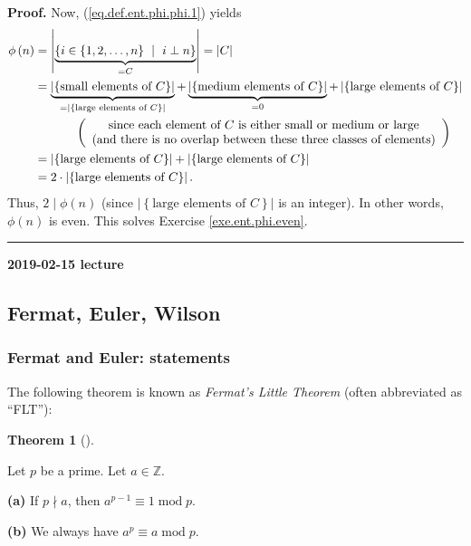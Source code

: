 \documentclass[numbers=enddot,12pt,final,onecolumn,notitlepage]{scrartcl}%
\numberwithin{exer}{subsection}
\theoremstyle{definition}
\newtheorem{theo}{Theorem}[subsection]
\newenvironment{theorem}[1][]
{\begin{theo}[#1]\begin{leftbar}}
{\end{leftbar}\end{theo}}
\newenvironment{fineprint}{\begin{small}}{\end{small}}
\newenvironment{proof}[1][Proof]{\noindent\textbf{#1.} }{\ \rule{0.5em}{0.5em}}
\begin{document}
\begin{fineprint}
\begin{proof}
Now, (\ref{eq.def.ent.phi.phi.1}) yields%
\begin{align*}
\phi\left(  n\right)   &  =\left\vert \underbrace{\left\{  i\in\left\{
1,2,\ldots,n\right\}  \ \mid\ i\perp n\right\}  }_{=C}\right\vert =\left\vert
C\right\vert \\
&  =\underbrace{\left\vert \left\{  \text{small elements of }C\right\}
\right\vert }_{=\left\vert \left\{  \text{large elements of }C\right\}
\right\vert }+\underbrace{\left\vert \left\{  \text{medium elements of
}C\right\}  \right\vert }_{=0}+\left\vert \left\{  \text{large elements of
}C\right\}  \right\vert \\
&  \ \ \ \ \ \ \ \ \ \ \left(
\begin{array}
[c]{c}%
\text{since each element of }C\text{ is either small or medium or large}\\
\text{(and there is no overlap between these three classes of elements)}%
\end{array}
\right) \\
&  =\left\vert \left\{  \text{large elements of }C\right\}  \right\vert
+\left\vert \left\{  \text{large elements of }C\right\}  \right\vert \\
&  =2\cdot\left\vert \left\{  \text{large elements of }C\right\}  \right\vert
.
\end{align*}
Thus, $2\mid\phi\left(  n\right)  $ (since $\left\vert \left\{  \text{large
elements of }C\right\}  \right\vert $ is an integer). In other words,
$\phi\left(  n\right)  $ is even. This solves Exercise \ref{exe.ent.phi.even}.
\end{proof}
\end{fineprint}

\begin{center}
\textbf{2019-02-15 lecture}
\end{center}

\subsection{Fermat, Euler, Wilson}

\subsubsection{Fermat and Euler: statements}

The following theorem is known as \textit{Fermat's Little Theorem} (often
abbreviated as \textquotedblleft FLT\textquotedblright):

\begin{theorem}
\label{thm.ent.fermat}Let $p$ be a prime. Let $a\in\mathbb{Z}$.

\textbf{(a)} If $p\nmid a$, then $a^{p-1}\equiv1\operatorname{mod}p$.

\textbf{(b)} We always have $a^{p}\equiv a\operatorname{mod}p$.
\end{theorem}
\end{document}
